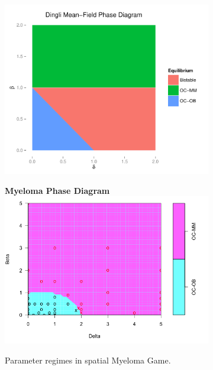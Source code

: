 \documentclass[12pt]{report}
\begin{document}
\begin{figure}[H]

	\begin{subfigure}[b]{0.8 \textwidth}
	\centering
	\includegraphics[width = 0.9 \linewidth]{Diagrams/dingli_phase-mf}
	\caption{}
	\end{subfigure}

	\begin{subfigure}[b]{0.8\textwidth}
	\centering
	\textbf{Myeloma Phase Diagram}
	\includegraphics[width = 0.9 \linewidth]{Diagrams/dingli_phase}
	\caption{Parameter regimes in spatial Myeloma Game. }
	\end{subfigure}
	
	\caption{}
\end{figure}

\newpage
\end{document}

